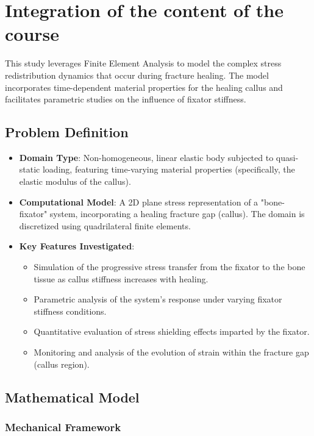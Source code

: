 \documentclass{article}
\begin{document}
\section{Integration of the content of the course}

This study leverages Finite Element Analysis to model the complex stress redistribution dynamics that occur during fracture healing. The model incorporates time-dependent material properties for the healing callus and facilitates parametric studies on the influence of fixator stiffness.

\subsection{Problem Definition}

\begin{itemize}
  \item \textbf{Domain Type}: Non-homogeneous, linear elastic body subjected to quasi-static loading, featuring time-varying material properties (specifically, the elastic modulus of the callus).
  \item \textbf{Computational Model}: A 2D plane stress representation of a "bone-fixator" system, incorporating a healing fracture gap (callus). The domain is discretized using quadrilateral finite elements.
  \item \textbf{Key Features Investigated}:
        \begin{itemize}
          \item Simulation of the progressive stress transfer from the fixator to the bone tissue as callus stiffness increases with healing.
          \item Parametric analysis of the system's response under varying fixator stiffness conditions.
          \item Quantitative evaluation of stress shielding effects imparted by the fixator.
          \item Monitoring and analysis of the evolution of strain within the fracture gap (callus region).
        \end{itemize}
\end{itemize}

\subsection{Mathematical Model}

\subsubsection{Mechanical Framework}
\end{document}
